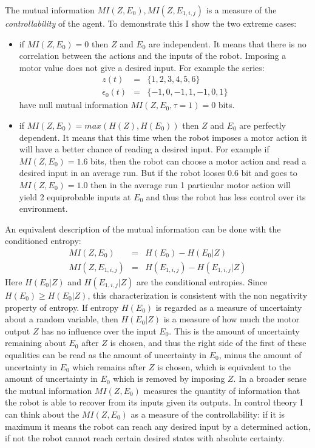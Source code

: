 The mutual information $MI(Z,E_0),MI(Z,E_{1,i,j})$ is a measure of the 
\textit{controllability} of the agent. To demonstrate this
I show the two extreme cases:
\begin{itemize}
\item if $MI(Z,E_0)=0$ then $Z$ and $E_0$ are independent.  It means
  that there is no correlation between the actions and the inputs of
  the robot.  Imposing a motor value does not give a desired input.
  For example the series:
 \begin{eqnarray}
z(t) & = &\{1, 2, 3, 4 ,5 ,6\}\\
\epsilon_{0}(t)& =&\{-1 ,0 ,-1, 1, -1 ,0, 1\}
\end{eqnarray}
have null mutual information $MI(Z,E_0,\tau=1)=0$ bits.
\item if $MI(Z,E_0)=max(H(Z),H(E_0))$ then $Z$ and $E_0$ are perfectly
  dependent.  It means that this time when the robot imposes a motor
  action it will have a better chance of reading a desired input.  For
  example if $MI(Z,E_0)=1.6$ bits, then the robot can choose a motor
  action and read a desired input in an average run.  But if the robot
  looses 0.6 bit and goes to $MI(Z,E_0)=1.0$ then in the average run 1
  particular motor action will yield 2 equiprobable inputs at $E_0$ and
  thus the robot has less control over its environment.
\end{itemize}
An equivalent description of the mutual information can be done with
the conditioned entropy:
\begin{eqnarray}
MI(Z,E_0) & = & H(E_0)-H(E_0|Z)\\
MI(Z,E_{1,i,j}) & = & H(E_{1,i,j})-H(E_{1,i,j}|Z)
\end{eqnarray}
Here $H(E_0|Z)$ and $H(E_{1,i,j}|Z)$ are the conditional entropies. 
Since $H(E_0)\geq H(E_0|Z)$,
this characterization is consistent with the non negativity property
of entropy. If entropy $H(E_0)$ is regarded as a measure of
uncertainty about a random variable, then $H(E_0|Z)$ is a measure of
how much the motor output $Z$ has no influence over the input $E_0$.
This is the amount of uncertainty remaining about $E_0$ after $Z$ is
chosen, and thus the right side of the first of these equalities can
be read as the amount of uncertainty in $E_0$, minus the amount of
uncertainty in $E_0$ which remains after $Z$ is chosen, which is
equivalent to the amount of uncertainty in $E_0$ which is removed by
imposing $Z$.  In a broader sense the mutual information $MI(Z,E_0)$
measures the quantity of information that the robot is able to recover
from its inputs given its outputs.  In control theory I can think
about the $MI(Z,E_0)$ as a measure of the controllability: if it is 
maximum it means the robot can reach any desired input by a determined
action, if not the robot cannot reach certain desired states with
absolute certainty.

